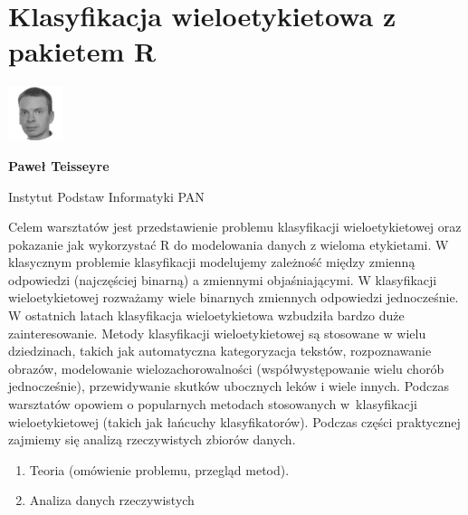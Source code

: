 \documentclass[\main/boa.tex]{subfiles}
\begin{document}
\section{Klasyfikacja wieloetykietowa z pakietem R}
\begin{minipage}[t]{0.915\textwidth}
	\center     
    \includegraphics[width=60px]{img/workshops/czarno_biale/pteisseyre-crop.png} 
\end{minipage}

\begin{minipage}{0.915\textwidth}
\centering
{\bf {} Paweł Teisseyre}
\end{minipage}

\vskip 0.3cm

\begin{affiliations}
\begin{minipage}{0.915\textwidth}
\centering
\large Instytut Podstaw Informatyki PAN  \\[2pt]
\end{minipage}
\end{affiliations}

\vskip 0.8cm

\opiswarsztatu Celem warsztatów jest przedstawienie problemu klasyfikacji wieloetykietowej oraz pokazanie jak wykorzystać R do modelowania danych z wieloma etykietami. W klasycznym problemie klasyfikacji modelujemy zależność między zmienną odpowiedzi (najczęściej binarną) a zmiennymi objaśniającymi. W klasyfikacji wieloetykietowej rozważamy wiele binarnych zmiennych odpowiedzi jednocześnie. W ostatnich latach klasyfikacja wieloetykietowa wzbudziła bardzo duże zainteresowanie. Metody klasyfikacji wieloetykietowej są stosowane w wielu dziedzinach, takich jak automatyczna kategoryzacja tekstów, rozpoznawanie obrazów, modelowanie wielozachorowalności (współwystępowanie wielu chorób jednocześnie), przewidywanie skutków ubocznych leków i wiele innych. Podczas warsztatów opowiem o popularnych metodach stosowanych w~klasyfikacji wieloetykietowej (takich jak łańcuchy klasyfikatorów). Podczas części praktycznej zajmiemy się analizą rzeczywistych zbiorów danych.

\planwarsztatu
\begin{enumerate}
\item Teoria (omówienie problemu, przegląd metod).
\item Analiza danych rzeczywistych
\end{enumerate}	 
\end{document}
